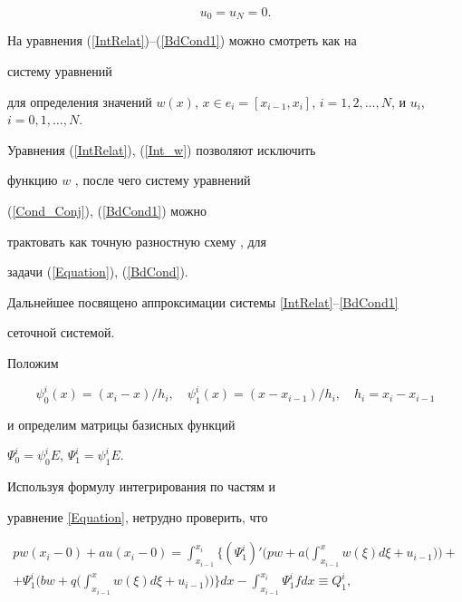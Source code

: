 \begin{equation} \label{BdCond1}


u_0=u_N=0.


\end{equation}





На уравнения (\ref{IntRelat})--(\ref{BdCond1}) можно смотреть как на


систему уравнений


для определения значений $w(x)$, $x\in e_i=[x_{i-1},x_i]$, $i=1, 2,


\dotsc, N$, и $u_i$, $i= 0,1,\dotsc,N$.


Уравнения (\ref{IntRelat}), (\ref{Int_w}) позволяют исключить


функцию $w$ \cite{DautPaim}, после чего систему уравнений


(\ref{Cond_Conj}), (\ref{BdCond1}) можно


трактовать как точную разностную схему \cite{Samarsky}, \cite{Korneev82} для


задачи (\ref{Equation}), (\ref{BdCond}).





Дальнейшее посвящено аппроксимации системы \eqref{IntRelat}--\eqref{BdCond1}


сеточной системой.





Положим


$$


\psi_0^i (x)=(x_i-x)/h_i,\quad


\psi_1^i (x)=(x-x_{i-1})/h_i,\quad h_i=x_i -x_{i-1}


$$


и определим матрицы базисных функций


$\Psi_0^i=\psi_0^i E$, $\Psi_1^i=\psi_1^i E$.


Используя формулу интегрирования по частям и 


уравнение \eqref{Equation}, нетрудно проверить, что


\begin{multline} \label{Potok1}


pw(x_i-0)+au(x_i-0)=\int_{x_{i-1}}^{x_i}


\bigg\{ (\Psi_1^i)'\bigg(pw +


a\bigg(\int_{x_{i-1}}^x


{w(\xi)d \xi }+u_{i-1}\bigg)\bigg)+ \\


%


+\Psi_1^i \bigg(bw+q\bigg(\int_{x_{i-1} }^x


{w(\xi)d\xi }+u_{i-1}\bigg)\bigg)


\bigg\} dx


- \int_{x_{i-1} }^{x_i } {\Psi_1^i fdx} \equiv Q_{1}^i,


\end{multline}


